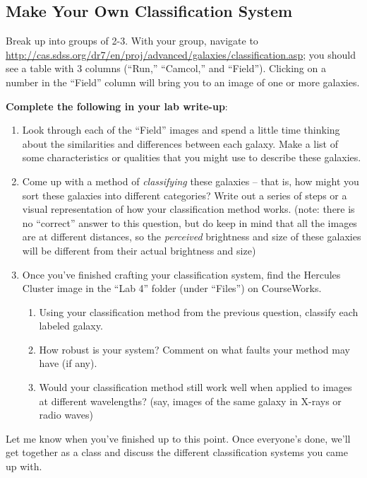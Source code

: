 \documentclass[11pt]{article}
\begin{document}
\subsection{Make Your Own Classification System}
Break up into groups of 2-3.  With your group, navigate to \url{http://cas.sdss.org/dr7/en/proj/advanced/galaxies/classification.asp}; you should see a table with 3 columns (``Run,'' ``Camcol,'' and ``Field'').  Clicking on a number in the ``Field'' column will bring you to an image of one or more galaxies.

\noindent
\textbf{Complete the following in your lab write-up}:
\begin{enumerate}
    \item Look through each of the ``Field'' images and spend a little time thinking about the similarities and differences between each galaxy. Make a list of some characteristics or qualities that you might use to describe these galaxies.
    
    \item Come up with a method of \emph{classifying} these galaxies -- that is, how might you sort these galaxies into different categories? Write out a series of steps or a visual representation of how your classification method works. (note: there is no ``correct'' answer to this question, but do keep in mind that all the images are at different distances, so the \emph{perceived} brightness and size of these galaxies will be different from their actual brightness and size)
    
    \item Once you've finished crafting your classification system, find the Hercules Cluster image in the ``Lab 4'' folder (under ``Files'') on CourseWorks. 
    \begin{enumerate}
        \item Using your classification method from the previous question, classify each labeled galaxy.
        
        \item How robust is your system? Comment on what faults your method may have (if any).
        
        \item Would your classification method still work well when applied to images at different wavelengths? (say, images of the same galaxy in X-rays or radio waves)
    \end{enumerate}  
\end{enumerate}
    
Let me know when you've finished up to this point. Once everyone's done, we'll get together as a class and discuss the different classification systems you came up with.
\medskip
\end{document}
